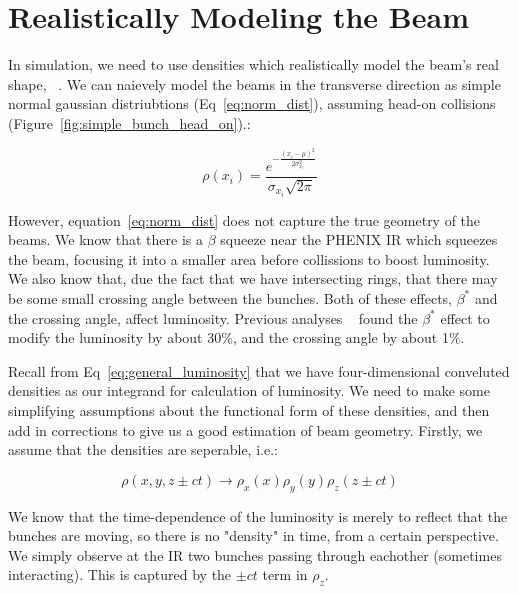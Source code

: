 \section{Realistically Modeling the Beam}
In simulation, we need to use densities which realistically model the beam's
real shape, ~\cite{herr2006lumi}. We can naievely model the beams in the transverse direction as
simple normal gaussian distriubtions (Eq~\ref{eq:norm_dist}), assuming head-on
collisions (Figure~\ref{fig:simple_bunch_head_on}).:

\begin{equation}
\label{eq:norm_dist}
\rho(x_{i}) = \frac{e^{ -\frac{(x_{i}-\mu)^2}{2\sigma_{x_i}^2}}}{\sigma_{x_i}\sqrt{2\pi}}
\end{equation}



However, equation~\ref{eq:norm_dist} does not capture the true geometry of the
beams. We know that there is a $\beta$ squeeze near the PHENIX IR which squeezes
the beam, focusing it into a smaller area before collissions to boost
luminosity.  We also know that, due the fact that we have intersecting rings,
that there may be some small crossing angle between the bunches. Both of these
effects, $\beta^{*}$ and the crossing angle, affect luminosity. Previous
analyses ~\cite{an888} found the $\beta^{*}$ effect to modify the luminosity by
about 30\%, and the crossing angle by about 1\%.

Recall from Eq~\ref{eq:general_luminosity} that we have four-dimensional
conveluted densities as our integrand for calculation of luminosity. We need to
make some simplifying assumptions about the functional form of these densities,
and then add in corrections to give us a good estimation of beam geometry.
Firstly, we assume that the densities are seperable, i.e.: 

\begin{equation}
\label{eq:sep_density}
\rho(x,y,z\pm ct) \rightarrow \rho_{x}(x)\rho_{y}(y)\rho_{z}(z\pm ct)
\end{equation}

We know that the time-dependence of the luminosity is merely to reflect that the
bunches are moving, so there is no "density" in time, from a certain
perspective. We simply observe at the IR two bunches passing through eachother
(sometimes interacting).  This is captured by the $\pm ct$ term in $\rho_{z}$. 

